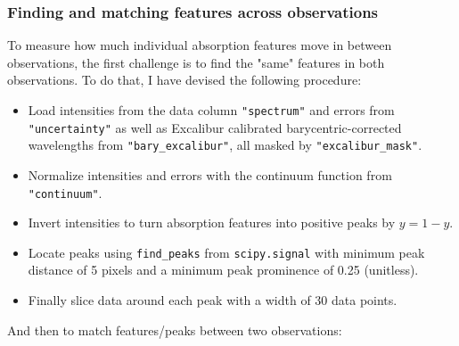     \subsubsection{Finding and matching features across observations}

    To measure how much individual absorption features move in between observations, the first challenge is to find the "same" features in both observations. To do that, I have devised the following procedure:
    
    \begin{itemize}
        \item Load intensities from the data column \verb|"spectrum"| and errors from \verb|"uncertainty"| as well as Excalibur calibrated barycentric-corrected wavelengths from \verb|"bary_excalibur"|, all masked by \verb|"excalibur_mask"|.
        \item Normalize intensities and errors with the continuum function from \verb|"continuum"|.
        \item Invert intensities to turn absorption features into positive peaks by $y = 1 - y$.
        \item Locate peaks using \verb|find_peaks| from \verb|scipy.signal| with minimum peak distance of 5 pixels and a minimum peak prominence of 0.25 (unitless).
        \item Finally slice data around each peak with a width of 30 data points. 
    \end{itemize}

    And then to match features/peaks between two observations:


